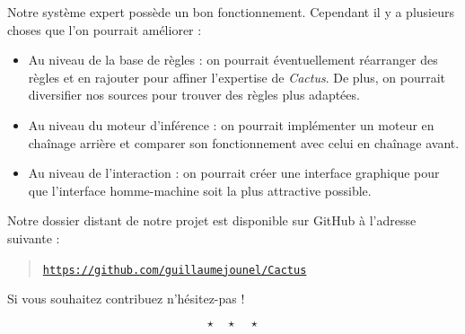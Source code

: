 \documentclass[a4paper,12pt]{article}
\begin{document}
	Notre système expert possède un bon fonctionnement. Cependant il y a plusieurs choses que l'on pourrait améliorer :
	\begin{itemize}
		\item Au niveau de la base de règles : on pourrait éventuellement réarranger des règles et en rajouter pour affiner l'expertise de \textit{Cactus}. De plus, on pourrait diversifier nos sources pour trouver des règles plus adaptées.
		\item Au niveau du moteur d'inférence : on pourrait implémenter un moteur en chaînage arrière et comparer son fonctionnement avec celui en chaînage avant.
		\item Au niveau de l'interaction : on pourrait créer une interface graphique pour que l'interface homme-machine soit la plus attractive possible.
	\end{itemize}
	
	Notre dossier distant de notre projet est disponible sur GitHub à l'adresse suivante :
	
	\begin{quote}
		\href{https://github.com/guillaumejounel/Cactus}{\texttt{https://github.com/guillaumejounel/Cactus}}
	\end{quote}
	
	
	Si vous souhaitez contribuez n'hésitez-pas !	

\[ \star \quad \star \quad \star \]
\newpage

\end{document}
